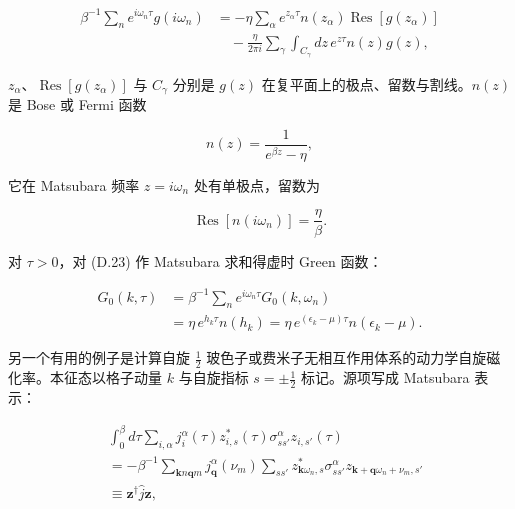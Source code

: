 \begin{align*}
\beta^ {- 1} \sum_ {n} e ^ {i\omega_ {n} \tau} g \left( i\omega_ {n} \right) & = - \eta \sum_{\alpha} e ^ {z_{\alpha} \tau} n \left( z_{\alpha} \right) \operatorname{Res} \left[ g \left( z_{\alpha} \right) \right]\\
& \quad - \frac {\eta}{2 \pi i} \sum_{\gamma} \int_{C _ {\gamma}} d z \, e ^ {z \tau} n ( z ) g ( z) ,
\tag{D.25}
\end{align*}

$z_{\alpha}$、$\operatorname{Res}[g(z_{\alpha})]$ 与 $C_{\gamma}$ 分别是 $g(z)$ 在复平面上的极点、留数与割线。$n(z)$ 是 Bose 或 Fermi 函数

\begin{equation*}
n ( z ) = \frac {1}{e ^ {\beta z} - \eta} ,
\tag{D.26}
\end{equation*}

它在 Matsubara 频率 $z = i\omega_{n}$ 处有单极点，留数为

\begin{equation*}
\operatorname{Res} \left[ n \left( i\omega_ {n} \right) \right] = \frac {\eta}{\beta}.
\tag{D.27}
\end{equation*}

对 $\tau > 0$，对 (D.23) 作 Matsubara 求和得虚时 Green 函数：

\begin{align*}
G _ {0} ( k, \tau ) & = \beta^ {- 1} \sum_ {n} e ^ {i\omega_ {n} \tau} G _ {0} \left( k, \omega_ {n} \right)\\
& = \eta \, e ^ {h_{k} \tau} n \left( h_{k} \right) = \eta \, e ^ {\left( \epsilon_{k} - \mu \right) \tau} n \left( \epsilon_{k} - \mu \right).
\tag{D.28}
\end{align*}

另一个有用的例子是计算自旋 $\frac{1}{2}$ 玻色子或费米子无相互作用体系的动力学自旋磁化率。本征态以格子动量 $k$ 与自旋指标 $s = \pm\frac{1}{2}$ 标记。源项写成 Matsubara 表示：

\begin{align*}
& \int_ {0} ^ {\beta} d \tau \sum_{i, \alpha} j_{i} ^ {\alpha} ( \tau ) z_{i, s} ^ {*} ( \tau ) \sigma_{ss'} ^ {\alpha} z_{i, s '} ( \tau )\\
& = - \beta^ {- 1} \sum_{\mathbf {k} n \mathbf {q} m} j_{\mathbf {q}} ^ {\alpha} \left( \nu_{m} \right) \sum_{ss'} z_{\mathbf {k} \omega_ {n}, s} ^ {*} \sigma_{ss'} ^ {\alpha} z_{\mathbf {k} + \mathbf {q} \omega_{n} + \nu_{m}, s '}\\
& \equiv \mathbf {z} ^ {\dagger} \hat {j} \mathbf {z} ,
\tag{D.29}
\end{align*}

